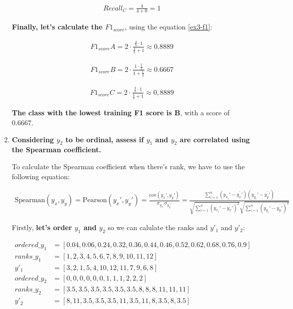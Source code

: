 \documentclass[12pt]{article}
\begin{document}
\begin{enumerate}[leftmargin=\labelsep]
    \[
        \begin{aligned}
            Recall_C = \frac{4}{4+0} = 1
        \end{aligned}
    \]

    \textbf{Finally, let's calculate the $F1_{score}$}, using the equation \eqref{ex3-f1}:

    \[
        \begin{aligned}
            F1_{score} A = 2 \cdot \frac{{ \frac{4}{5} \cdot 1 }}{{ \frac{4}{5} + 1 }} \approx 0.8889
        \end{aligned}
    \]

    \[
        \begin{aligned}
            F1_{score} B = 2 \cdot \frac{{ 1 \cdot \frac{1}{2} }}{{ 1 + \frac{1}{2} }} \approx 0.6667
        \end{aligned}
    \]

    \[
        \begin{aligned}
            F1_{score} C = 2 \cdot \frac{{ \frac{4}{5} \cdot 1 }}{{ \frac{4}{5} + 1 }} \approx 0,8889
        \end{aligned}
    \]

    \textbf{The class with the lowest training F1 score is B}, with a score of 0.6667.

    \item \textbf{Considering $y_2$ to be ordinal, assess if $y_1$ and $y_2$ are correlated using the Spearman coefficient.}

    \vskip 0.3cm

    To calculate the Spearman coefficient when there's rank, we have to use the following equation:

    \begin{equation}\label{ex4-sp}
        \begin{split}
            \text{Spearman}(y_x, y_y) = \text{Pearson}(y_x', y_y') = \frac{\text{cov}(y_x', y_y')}{\sigma_{y_x'} \sigma_{y_y'}}
            = \frac{\sum_{i=1}^{n} (y_{x_i}' - \bar{y_x'})(y_{y_i}' - \bar{y_y'})}{\sqrt{\sum_{i=1}^{n} (y_{x_i}' - \bar{y_x'})^2}\sqrt{\sum_{i=1}^{n} (y_{y_i}' - \bar{y_y'})^2}}
        \end{split}
    \end{equation}

    Firstly, \textbf{let's order $y_1$ and $y_2$} so we can calulate the ranks and $y'_1$ and $y'_2$:

    \begin{align*}
        ordered\_y_{1} & = [0.04, 0.06, 0.24, 0.32, 0.36, 0.44, 0.46, 0.52, 0.62, 0.68, 0.76, 0.9]\\
        ranks\_y_{1}   & = [1,2,3,4,5,6,7,8,9,10,11,12]\\
        y'_{1}         & = [3,2,1,5,4,10,12,11,7,9,6,8]\\
        ordered\_y_{2} & = [0,0,0,0,0,0,1,1,1,2,2,2]\\
        ranks\_y_{2}   & = [3.5, 3.5, 3.5, 3.5, 3.5, 3.5, 8, 8, 8, 11, 11, 11]\\
        y'_{2}         & = [8, 11, 3.5, 3.5, 3.5, 11, 3.5, 11, 8, 3.5, 8, 3.5]
    \end{align*}


\end{enumerate}
\end{document}
